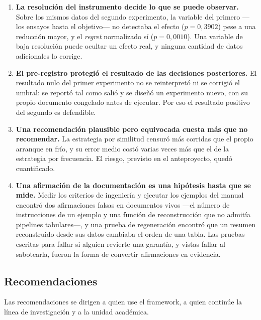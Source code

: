 \documentclass[12pt,letterpaper,oneside]{article}
\begin{document}
\begin{enumerate}
  \item \textbf{La resolución del instrumento decide lo que se puede observar.} Sobre los
        mismos datos del segundo experimento, la variable del primero ---los ensayos hasta
        el objetivo--- no detectaba el efecto ($p = 0{,}3902$) pese a una reducción mayor,
        y el \textit{regret} normalizado sí ($p = 0{,}0010$). Una variable de baja
        resolución puede ocultar un efecto real, y ninguna cantidad de datos adicionales lo
        corrige.

  \item \textbf{El pre-registro protegió el resultado de las decisiones posteriores.} El
        resultado nulo del primer experimento no se reinterpretó ni se corrigió el umbral: se
        reportó tal como salió y se diseñó un experimento nuevo, con su propio documento
        congelado antes de ejecutar. Por eso el resultado positivo del segundo es
        defendible.

  \item \textbf{Una recomendación plausible pero equivocada cuesta más que no recomendar.}
        La estrategia por similitud censuró más corridas que el propio arranque en frío, y
        su error medio costó varias veces más que el de la estrategia por frecuencia. El
        riesgo, previsto en el anteproyecto, quedó cuantificado.

  \item \textbf{Una afirmación de la documentación es una hipótesis hasta que se mide.}
        Medir los criterios de ingeniería y ejecutar los ejemplos del manual encontró dos
        afirmaciones falsas en documentos vivos ---el número de instrucciones de un ejemplo
        y una función de reconstrucción que no admitía pipelines tabulares---, y una prueba
        de regeneración encontró que un resumen reconstruido desde sus datos cambiaba el
        orden de una tabla. Las pruebas escritas para fallar si alguien revierte una
        garantía, y vistas fallar al sabotearla, fueron la forma de convertir afirmaciones
        en evidencia.
\end{enumerate}

\subsection{Recomendaciones}

Las recomendaciones se dirigen a quien use el framework, a quien continúe la línea de
investigación y a la unidad académica.
\end{document}
